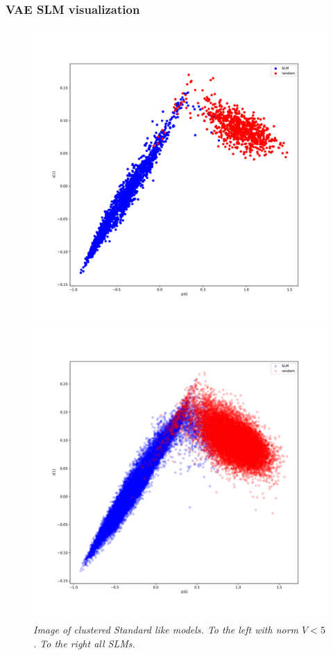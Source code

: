 \documentclass{beamer}
\begin{document}
\begin{frame}
\frametitle{VAE SLM visualization}
\begin{figure}
	\begin{minipage}{0.48\linewidth}
		\includegraphics[scale=0.21]{vae_slm_norm.pdf}
	\end{minipage}
	\begin{minipage}{0.48\linewidth}
		\includegraphics[scale=0.21]{vae_slm_all.pdf}
	\end{minipage}
	\caption{\it Image of clustered Standard like models. To the left with norm $V<5$. To the right all SLMs.}
\end{figure}
\end{frame}
\end{document}
